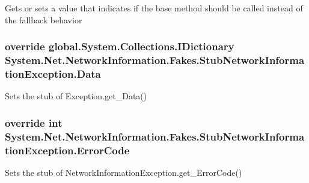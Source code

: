 Gets or sets a value that indicates if the base method should be called instead of the fallback behavior

\hypertarget{class_system_1_1_net_1_1_network_information_1_1_fakes_1_1_stub_network_information_exception_a0956efc2ac09093857d962371d777cb7}{
\subsubsection[{Data}]{\setlength{\rightskip}{0pt plus 5cm}override global.\-System.\-Collections.\-I\-Dictionary System.\-Net.\-Network\-Information.\-Fakes.\-Stub\-Network\-Information\-Exception.\-Data\hspace{0.3cm}{\ttfamily [get]}}}\label{class_system_1_1_net_1_1_network_information_1_1_fakes_1_1_stub_network_information_exception_a0956efc2ac09093857d962371d777cb7}


Sets the stub of Exception.\-get\-\_\-\-Data()

\hypertarget{class_system_1_1_net_1_1_network_information_1_1_fakes_1_1_stub_network_information_exception_a073345123b9173a6ff4c1572490a53f5}{
\subsubsection[{Error\-Code}]{\setlength{\rightskip}{0pt plus 5cm}override int System.\-Net.\-Network\-Information.\-Fakes.\-Stub\-Network\-Information\-Exception.\-Error\-Code\hspace{0.3cm}{\ttfamily [get]}}}\label{class_system_1_1_net_1_1_network_information_1_1_fakes_1_1_stub_network_information_exception_a073345123b9173a6ff4c1572490a53f5}


Sets the stub of Network\-Information\-Exception.\-get\-\_\-\-Error\-Code()

